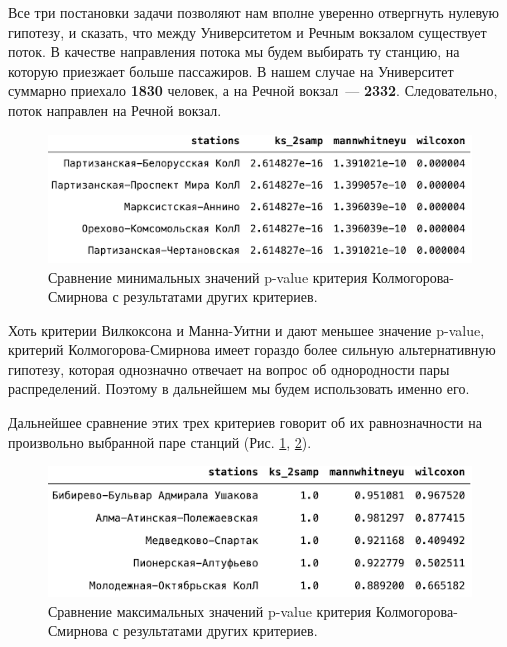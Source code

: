 \documentclass[12pt, fleqn, titlepage]{article}
\begin{document}
    Все три постановки задачи позволяют нам вполне уверенно отвергнуть нулевую гипотезу, и сказать, что между 
    Университетом и Речным вокзалом существует поток. В качестве направления потока мы будем выбирать ту станцию, 
    на которую приезжает больше пассажиров. В нашем случае на Университет суммарно приехало \textbf{1830} человек, а 
    на Речной вокзал~--- \textbf{2332}. Следовательно, поток направлен на Речной вокзал.
    \begin{figure}[ht]
        \centering
        \includegraphics[scale=0.5]{pics/min_ks_2samp.png}
        \caption{Сравнение минимальных значений p-value критерия Колмогорова-Смирнова с результатами других критериев.}
        \label{min_ks_2samp}
    \end{figure}

    Хоть критерии Вилкоксона и Манна-Уитни и дают меньшее значение p-value, критерий Колмогорова-Смирнова имеет 
    гораздо более сильную альтернативную гипотезу, которая однозначно отвечает на вопрос об однородности пары распределений. 
    Поэтому в дальнейшем мы будем использовать именно его.

    Дальнейшее сравнение этих трех критериев говорит об их равнозначности на произвольно выбранной паре станций 
    (Рис. \ref{min_ks_2samp}, \ref{max_ks_2samp}).

    \begin{figure}[ht]
        \centering
        \includegraphics[scale=0.5]{pics/max_ks_2samp.png}
        \caption{Сравнение максимальных значений p-value критерия Колмогорова-Смирнова с результатами других критериев.}
        \label{max_ks_2samp}
    \end{figure}
\end{document}
